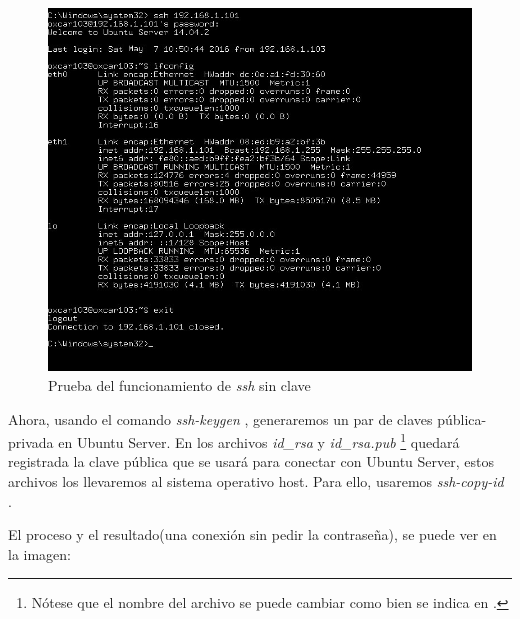 \documentclass[paper=a4, fontsize=11pt]{scrartcl} %
\numberwithin{equation}{section} %
\numberwithin{figure}{section} %
\numberwithin{table}{section} %
\begin{document}
\begin{enumerate}
		\begin{figure}[H]
			\centering
			\includegraphics[width=15cm]{Ejercicio_8b.jpg}
			\caption{Prueba del funcionamiento de \textit{ssh} sin clave}
			\label{fig:test_1}	
		\end{figure}
		
		Ahora, usando el comando \textit{ssh-keygen} \cite{man_ssh-keygen}, generaremos un par de
		claves pública-privada en Ubuntu Server. En los archivos \textit{id\_rsa} y \textit{id\_rsa.pub}
		\footnote{Nótese que el nombre del archivo se puede cambiar como bien se indica en
		\cite{man_ssh-keygen}.} quedará registrada la clave pública que se usará para conectar con
		Ubuntu Server, estos archivos los llevaremos al sistema operativo host. Para ello, usaremos
		\textit{ssh-copy-id} \cite{man_ssh-copy-id}.
		
		El proceso y el resultado(una conexión sin pedir la contraseña), se puede ver en la imagen:
		

\end{enumerate}
\end{document}
